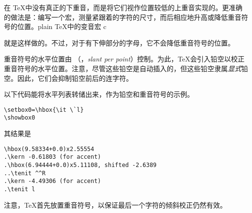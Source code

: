 \documentclass{book}
\begin{document}
在 \TeX 中没有真正的下重音，而是将它们视作位置较低的上重音实现的。更准确的做法是：编写一个宏，测量紧跟着的字符的尺寸，而后相应地升高或降低重音符号的位置。plain \TeX 中的变音宏 \cstoidx c\par 就是这样做的。不过，对于有下伸部分的字母，它不会降低重音符号的位置。

重音符号的水平位置由 （，\emph{slant per point}）控制。为此，\TeX 会引入铅空以校正重音符号的水平位置。注意，尽管这些铅空是自动插入的，但这些铅空隶属\emph{显式}铅空。因此，它们会抑制铅空前后的连字符。

以下代码能将水平列表转储出来，作为铅空和重音符号的示例。
\begin{verbatim}
\setbox0=\hbox{\it \`l}
\showbox0
\end{verbatim}
其结果是
\begin{verbatim}
\hbox(9.58334+0.0)x2.55554
.\kern -0.61803 (for accent)
.\hbox(6.94444+0.0)x5.11108, shifted -2.6389
..\tenit ^^R
.\kern -4.49306 (for accent)
.\tenit l
\end{verbatim}
注意，\TeX 首先放置重音符号，以保证最后一个字符的倾斜校正仍然有效。

\end{document}
